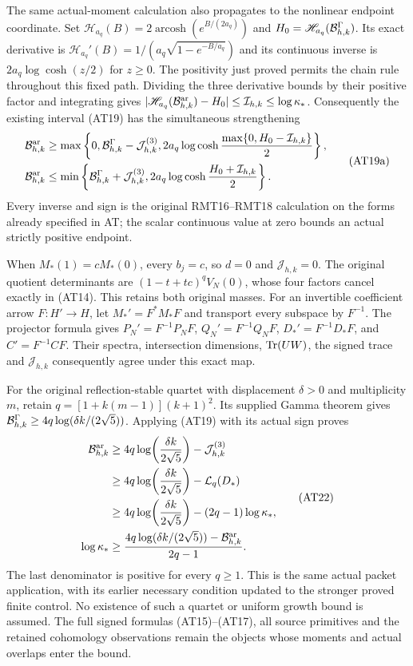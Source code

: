 The same actual-moment calculation also propagates to the nonlinear
endpoint coordinate. Set
$\mathscr H_{a_q}(B)=2\operatorname{arcosh}(e^{B/(2a_q)})$ and
$H_0=\mathscr H_{a_q}(\mathcal B^\Gamma_{h,k})$.
Its exact derivative is
$\mathscr H_{a_q}'(B)=1/(a_q\sqrt{1-e^{-B/a_q}})$ and its continuous
inverse is $2a_q\log\cosh(z/2)$ for $z\ge0$.
The positivity just proved permits the chain rule throughout this
fixed path. Dividing the three derivative bounds by their positive
factor and integrating gives
$|\mathscr H_{a_q}(\mathcal B^{\mathrm{ar}}_{h,k})-H_0|
\le\mathcal I_{h,k}\le\log\kappa_*$.
Consequently the existing interval (AT19) has the simultaneous
strengthening
\[
 \begin{aligned}
 \mathcal B^{\mathrm{ar}}_{h,k}&\ge
 \max\left\{0,\mathcal B^\Gamma_{h,k}-\mathcal J_{h,k}^{(3)},
 2a_q\log\cosh\frac{\max\{0,H_0-\mathcal I_{h,k}\}}2\right\},\\
 \mathcal B^{\mathrm{ar}}_{h,k}&\le
 \min\left\{\mathcal B^\Gamma_{h,k}+\mathcal J_{h,k}^{(3)},
 2a_q\log\cosh\frac{H_0+\mathcal I_{h,k}}2\right\}.
 \end{aligned}
 \tag{AT19a}
\]
Every inverse and sign is the original RMT16--RMT18 calculation
on the forms already specified in AT; the scalar continuous value
at zero bounds an actual strictly positive endpoint.

When $M_*(1)=cM_*(0)$, every $b_j=c$, so $d=0$ and
$\mathcal J_{h,k}=0$. The original quotient determinants are
$(1-t+tc)^qV_N(0)$, whose four factors cancel exactly in (AT14).
This retains both original masses. For an invertible coefficient
arrow $F:H'\to H$, let $M_*'=F^*M_*F$ and transport every subspace
by $F^{-1}$. The projector formula gives
$P_N'=F^{-1}P_NF$, $Q_N'=F^{-1}Q_NF$,
$D_*'=F^{-1}D_*F$, and $C'=F^{-1}CF$.
Their spectra, intersection dimensions, $\operatorname{Tr}(UW)$, the signed
trace and $\mathcal J_{h,k}$ consequently agree under this exact map.

For the original reflection-stable quartet with displacement
$\delta>0$ and multiplicity $m$, retain
$q=[1+k(m-1)](k+1)^2$. Its supplied Gamma theorem gives
$\mathcal B^\Gamma_{h,k}\ge4q\log(\delta k/(2\sqrt5))$.
Applying (AT19) with its actual sign proves
\[
 \begin{aligned}
 \mathcal B^{\mathrm{ar}}_{h,k}
 &\ge4q\log\!\left(\frac{\delta k}{2\sqrt5}\right)
                     -\mathcal J_{h,k}^{(3)}\\
 &\ge4q\log\!\left(\frac{\delta k}{2\sqrt5}\right)
                     -\mathcal L_q(D_*)\\
 &\ge4q\log\!\left(\frac{\delta k}{2\sqrt5}\right)
                     -(2q-1)\log\kappa_*,\\
 \log\kappa_*&\ge
  \frac{4q\log(\delta k/(2\sqrt5))-\mathcal B^{\mathrm{ar}}_{h,k}}{2q-1}.
 \end{aligned}
 \tag{AT22}
\]
The last denominator is positive for every $q\ge1$. This is the
same actual packet application, with its earlier necessary
condition updated to the stronger proved finite control.
No existence of such a quartet or uniform growth bound is assumed.
The full signed formulas (AT15)--(AT17), all source primitives and
the retained cohomology observations remain the objects whose
moments and actual overlaps enter the bound.

